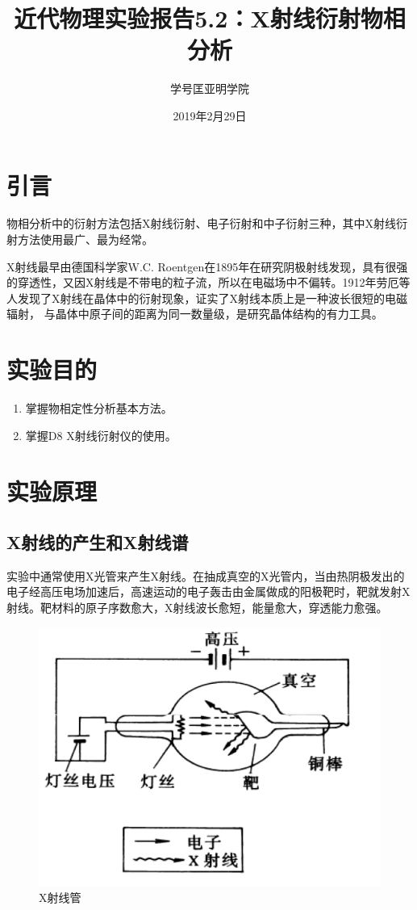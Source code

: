 \documentclass[a4paper]{article}
\title{近代物理实验报告5.2：X射线衍射物相分析}
\author{\quad 学号\quad 匡亚明学院}
\date{2019年2月29日}
\begin{document}
\maketitle


\section{引言}
物相分析中的衍射方法包括X射线衍射、电子衍射和中子衍射三种，其中X射线衍射方法使用最广、最为经常。

X射线最早由德国科学家W.C. Roentgen在1895年在研究阴极射线发现，具有很强的穿透性，又因X射线是不带电的粒子流，所以在电磁场中不偏转。1912年劳厄等人发现了X射线在晶体中的衍射现象，证实了X射线本质上是一种波长很短的电磁辐射，
与晶体中原子间的距离为同一数量级，是研究晶体结构的有力工具。
\section{实验目的}
\begin{enumerate}
\item 掌握物相定性分析基本方法。
\item 掌握D8 X射线衍射仪的使用。
\end{enumerate}


\section{实验原理}

\subsection{X射线的产生和X射线谱}
实验中通常使用X光管来产生X射线。在抽成真空的X光管内，当由热阴极发出的电子经高压电场加速后，高速运动的电子轰击由金属做成的阳极靶时，靶就发射X射线。靶材料的原子序数愈大，X射线波长愈短，能量愈大，穿透能力愈强。
\begin{figure}[H]
	\centering
	\includegraphics[width=0.5\linewidth]{fig/X1.jpg}
	\caption{X射线管}
\end{figure}
\end{document}

